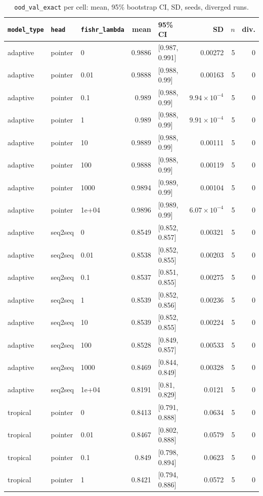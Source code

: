 \documentclass[10pt]{article}
\begin{document}
{\small
\begin{longtable}{lllrlrrr}
\caption{\texttt{ood\_val\_exact} per cell: mean, 95\% bootstrap CI, SD, seeds, diverged runs.}\label{tab:summary-ood_val_exact}\\
\toprule
\texttt{model\_type} & \texttt{head} & \texttt{fishr\_lambda} & mean & 95\% CI & SD & $n$ & div.\\
\midrule
\endhead
adaptive & pointer & 0 & 0.9886 & [0.987, 0.991] & 0.00272 & 5 & 0\\
adaptive & pointer & 0.01 & 0.9888 & [0.988, 0.99] & 0.00163 & 5 & 0\\
adaptive & pointer & 0.1 & 0.989 & [0.988, 0.99] & $9.94\times10^{-4}$ & 5 & 0\\
adaptive & pointer & 1 & 0.989 & [0.988, 0.99] & $9.91\times10^{-4}$ & 5 & 0\\
adaptive & pointer & 10 & 0.9889 & [0.988, 0.99] & 0.00111 & 5 & 0\\
adaptive & pointer & 100 & 0.9888 & [0.988, 0.99] & 0.00119 & 5 & 0\\
adaptive & pointer & 1000 & 0.9894 & [0.989, 0.99] & 0.00104 & 5 & 0\\
adaptive & pointer & 1e+04 & 0.9896 & [0.989, 0.99] & $6.07\times10^{-4}$ & 5 & 0\\
adaptive & seq2seq & 0 & 0.8549 & [0.852, 0.857] & 0.00321 & 5 & 0\\
adaptive & seq2seq & 0.01 & 0.8538 & [0.852, 0.855] & 0.00203 & 5 & 0\\
adaptive & seq2seq & 0.1 & 0.8537 & [0.851, 0.855] & 0.00275 & 5 & 0\\
adaptive & seq2seq & 1 & 0.8539 & [0.852, 0.856] & 0.00236 & 5 & 0\\
adaptive & seq2seq & 10 & 0.8539 & [0.852, 0.855] & 0.00224 & 5 & 0\\
adaptive & seq2seq & 100 & 0.8528 & [0.849, 0.857] & 0.00533 & 5 & 0\\
adaptive & seq2seq & 1000 & 0.8469 & [0.844, 0.849] & 0.00328 & 5 & 0\\
adaptive & seq2seq & 1e+04 & 0.8191 & [0.81, 0.829] & 0.0121 & 5 & 0\\
tropical & pointer & 0 & 0.8413 & [0.791, 0.888] & 0.0634 & 5 & 0\\
tropical & pointer & 0.01 & 0.8467 & [0.802, 0.888] & 0.0579 & 5 & 0\\
tropical & pointer & 0.1 & 0.849 & [0.798, 0.894] & 0.0623 & 5 & 0\\
tropical & pointer & 1 & 0.8421 & [0.794, 0.886] & 0.0572 & 5 & 0\\

\end{longtable}}
\end{document}
